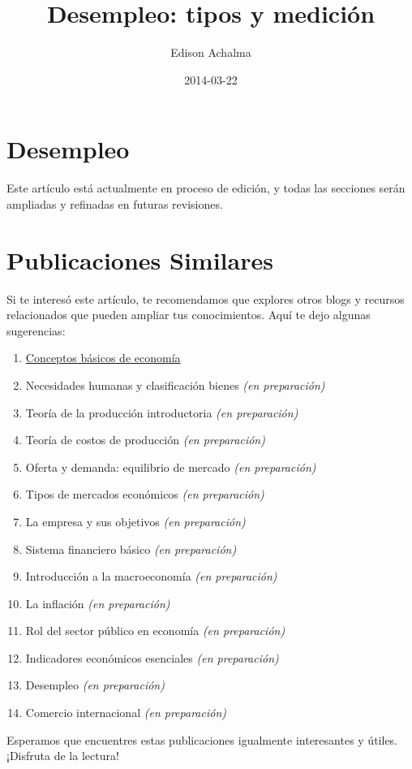 \documentclass[
  jou,
  floatsintext,
  longtable,
  a4paper,
  nolmodern,
  notxfonts,
  notimes,
  12pt,
  colorlinks=true,linkcolor=blue,citecolor=blue,urlcolor=blue]{apa7}
\title{Desempleo: tipos y medición}
\author{Edison Achalma}
\affiliation{
{Escuela Profesional de Economía, Universidad Nacional de San Cristóbal
de Huamanga}}
\date{2014-03-22}
\providecommand{\tightlist}{%
  \setlength{\itemsep}{0pt}\setlength{\parskip}{0pt}}
\begin{document}
\maketitle


\hypertarget{toc}{}
\tableofcontents
\newpage
\section[Introduction]{Desempleo}

\setcounter{secnumdepth}{3}

\setlength\LTleft{0pt}




Este artículo está actualmente en proceso de edición, y todas las
secciones serán ampliadas y refinadas en futuras revisiones.

\section{Publicaciones Similares}\label{publicaciones-similares}

Si te interesó este artículo, te recomendamos que explores otros blogs y
recursos relacionados que pueden ampliar tus conocimientos. Aquí te dejo
algunas sugerencias:

\begin{enumerate}
\def\labelenumi{\arabic{enumi}.}
\tightlist
\item
  \href{https://achalmaedison.netlify.app/cursos/pre_economia/2014-i/sesiones/01-conceptos-basicos-de-economia/index.pdf}{}
  \href{https://achalmaedison.netlify.app/cursos/pre_economia/2014-i/sesiones/01-conceptos-basicos-de-economia}{Conceptos
  básicos de economía}
\item
  Necesidades humanas y clasificación bienes \emph{(en preparación)}
\item
  Teoría de la producción introductoria \emph{(en preparación)}
\item
  Teoría de costos de producción \emph{(en preparación)}
\item
  Oferta y demanda: equilibrio de mercado \emph{(en preparación)}
\item
  Tipos de mercados económicos \emph{(en preparación)}
\item
  La empresa y sus objetivos \emph{(en preparación)}
\item
  Sistema financiero básico \emph{(en preparación)}
\item
  Introducción a la macroeconomía \emph{(en preparación)}
\item
  La inflación \emph{(en preparación)}
\item
  Rol del sector público en economía \emph{(en preparación)}
\item
  Indicadores económicos esenciales \emph{(en preparación)}
\item
  Desempleo \emph{(en preparación)}
\item
  Comercio internacional \emph{(en preparación)}
\end{enumerate}

Esperamos que encuentres estas publicaciones igualmente interesantes y
útiles. ¡Disfruta de la lectura!
\end{document}
